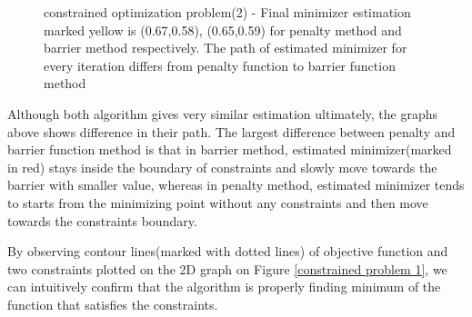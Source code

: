 \documentclass[twoside,11pt]{article}
\begin{document}
\begin{figure}[ht!]%
\centering
{} 
\caption{constrained optimization problem(2) - Final minimizer estimation marked yellow is (0.67,0.58), (0.65,0.59) for penalty method and barrier method respectively. The path of estimated minimizer for every iteration differs from penalty function to barrier function method}
\label{constrained problem 2-barrier}
\end{figure}

Although both algorithm gives very similar estimation ultimately, the graphs above shows difference in their path. The largest difference between penalty and barrier function method is that in barrier method, estimated minimizer(marked in red) stays inside the boundary of constraints and slowly move towards the barrier with smaller value, whereas in penalty method, estimated minimizer tends to starts from the minimizing point without any constraints and then move towards the constraints boundary.

By observing contour lines(marked with dotted lines) of objective function and two constraints plotted on the 2D graph on Figure \ref{constrained problem 1}, we can intuitively confirm that the algorithm is properly finding minimum of the function that satisfies the constraints.
\end{document}
